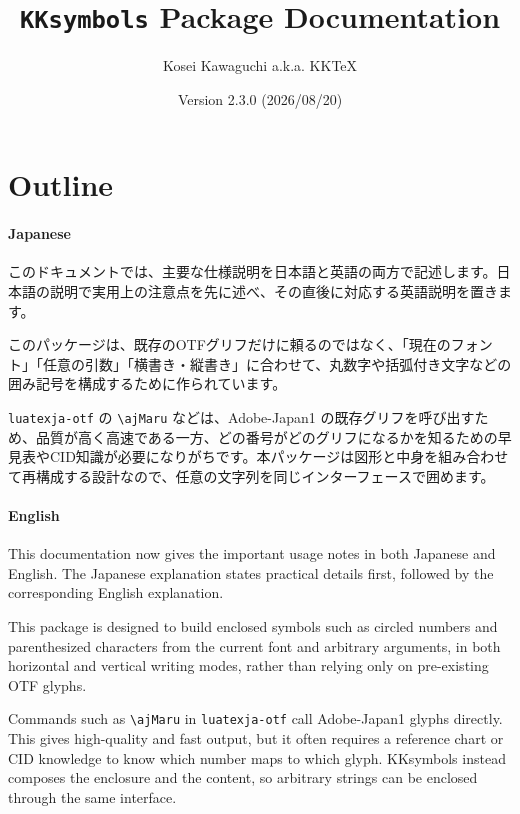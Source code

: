 \documentclass[luatex,fontsize=8pt,paper=b5,twoside]{jlreq}%
\title{\texttt{KKsymbols} Package Documentation}
\author{Kosei Kawaguchi a.k.a. KKTeX}
\date{Version 2.3.0 (2026/08/20)}
\begin{document}
\begin{titlepage}
  \maketitle
\end{titlepage}
\newpage
\tableofcontents
\newpage

\section{Outline}
\paragraph{Japanese}
このドキュメントでは、主要な仕様説明を日本語と英語の両方で記述します。日本語の説明で実用上の注意点を先に述べ、その直後に対応する英語説明を置きます。

このパッケージは、既存のOTFグリフだけに頼るのではなく、「現在のフォント」「任意の引数」「横書き・縦書き」に合わせて、丸数字や括弧付き文字などの囲み記号を構成するために作られています。

\texttt{luatexja-otf} の \verb|\ajMaru| などは、Adobe-Japan1 の既存グリフを呼び出すため、品質が高く高速である一方、どの番号がどのグリフになるかを知るための早見表やCID知識が必要になりがちです。本パッケージは図形と中身を組み合わせて再構成する設計なので、任意の文字列を同じインターフェースで囲めます。

\paragraph{English}
This documentation now gives the important usage notes in both Japanese and English. The Japanese explanation states practical details first, followed by the corresponding English explanation.

This package is designed to build enclosed symbols such as circled numbers and parenthesized characters from the current font and arbitrary arguments, in both horizontal and vertical writing modes, rather than relying only on pre-existing OTF glyphs.

Commands such as \verb|\ajMaru| in \texttt{luatexja-otf} call Adobe-Japan1 glyphs directly. This gives high-quality and fast output, but it often requires a reference chart or CID knowledge to know which number maps to which glyph. KKsymbols instead composes the enclosure and the content, so arbitrary strings can be enclosed through the same interface.
\end{document}
